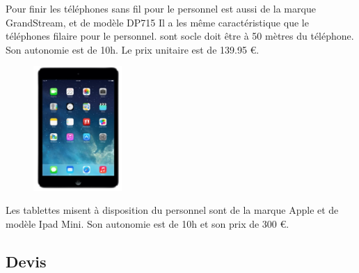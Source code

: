 Pour finir les téléphones sans fil pour le personnel est aussi de la marque GrandStream, et de modèle DP715
Il a les même caractéristique que le téléphones filaire pour le personnel. sont socle doit être à 50 mètres du téléphone.
Son autonomie est de 10h. Le prix unitaire est de 139.95 \euro.


\begin{figure}[!ht]
    \center
    \includegraphics[width=0.3\textwidth]{./images/32.png}
\end{figure}

Les tablettes misent à disposition du personnel sont de la marque Apple et de modèle Ipad Mini. Son autonomie est de 10h et son prix de 300 \euro.




\subsection{Devis}

